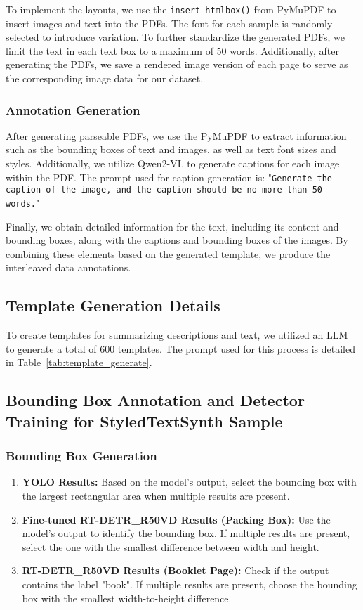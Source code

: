 To implement the layouts, we use the  \texttt{insert\_htmlbox()}  from PyMuPDF to insert images and text into the PDFs. The font for each sample is randomly selected to introduce variation. To further standardize the generated PDFs, we limit the text in each text box to a maximum of 50 words. Additionally, after generating the PDFs, we save a rendered image version of each page to serve as the corresponding image data for our dataset.


\subsubsection{Annotation Generation}
After generating parseable PDFs, we use the PyMuPDF to extract information such as the bounding boxes of text and images, as well as text font sizes and styles. Additionally, we utilize Qwen2-VL to generate captions for each image within the PDF. The prompt used for caption generation is: "\texttt{Generate the caption of the image, and the caption should be no more than 50 words.}"

Finally, we obtain detailed information for the text, including its content and bounding boxes, along with the captions and bounding boxes of the images. By combining these elements based on the generated template, we produce the interleaved data annotations.

\subsection{Template Generation Details}




To create templates for summarizing descriptions and text, we utilized an LLM to generate a total of 600 templates. The prompt used for this process is detailed in Table~\ref{tab:template_generate}.



\subsection{Bounding Box Annotation and Detector Training  for StyledTextSynth Sample}

\subsubsection{Bounding Box Generation}

\begin{enumerate}
    \item \textbf{YOLO Results:} Based on the model's output, select the bounding box with the largest rectangular area when multiple results are present.
    \item \textbf{Fine-tuned RT-DETR\_R50VD Results (Packing Box):} Use the model's output to identify the bounding box. If multiple results are present, select the one with the smallest difference between width and height.
    \item \textbf{RT-DETR\_R50VD Results (Booklet Page):} Check if the output contains the label "book". If multiple results are present, choose the bounding box with the smallest width-to-height difference.
\end{enumerate}

